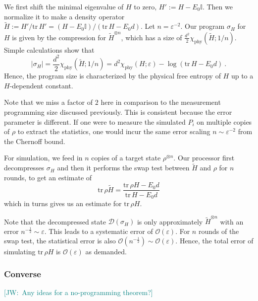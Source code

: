 \documentclass[11pt,letterpaper]{article}
\def\id{\mathbf{1}}
\def\eps{\varepsilon}
\def\O{\mathcal{O}}
\def\id{\mathbb{I}}
\def\tr{\mathrm{tr}}
\newcommand{\JW}[1]{\textcolor{teal}{[JW:\ #1]}}
\begin{document}
We first shift the minimal eigenvalue of $H$ to zero, $H':=H-E_0\id$. Then we normalize it to make a density operator $\tilde H:=H'/\tr\, H'=(H-E_0\id)/(\tr\,H-E_0d)$. Let $n=\eps^{-2}$. Our program $\sigma_H$ for $H$ is given by the compression for $\tilde H^{\otimes n}$, which has a size of $\frac{d^2}{2}\chi_\mathrm{phy}(\tilde H;1/n)$. Simple calculations show that
\begin{equation}
    |\sigma_H|=\frac{d^2}{2}\chi_\mathrm{phy}(\tilde H;1/n) = d^2\chi_\mathrm{phy}(H;\eps) - \log (\tr\, H-E_0d)\ .
\end{equation}
Hence, the program size is characterized by the physical free entropy of $H$ up to a $H$-dependent constant.

Note that we miss a factor of $2$ here in comparison to the measurement programming size discussed previously. This is consistent because the error parameter is different. If one were to measure the simulated $P_i$ on multiple copies of $\rho$ to extract the statistics, one would incur the same error scaling $n\sim \eps^{-2}$ from the Chernoff bound. 

For simulation, we feed in $n$ copies of a target state $\rho^{\otimes n}$. Our processor first decompresses $\sigma_H$ and then it performs the swap test between $\tilde H$ and $\rho$ for $n$ rounds, to get an estimate of
\begin{equation}
    \tr\, \rho\tilde H = \frac{\tr\, \rho H-E_0d}{\tr\, H-E_0d}
\end{equation}
which in turns gives us an estimate for $\tr\,\rho H$. 

Note that the decompressed state $\mathcal{D}(\sigma_H)$ is only approximately $\tilde H^{\otimes n}$ with an error $n^{-\frac12}\sim\eps$. This leads to a systematic error of $\O(\eps)$. For $n$ rounds of the swap test, the statistical error is also $\O(n^{-\frac12})\sim\O(\eps)$. Hence, the total error of simulating $\tr\,\rho H$ is $\O(\eps)$ as demanded.

\subsubsection{Converse}
\JW{Any ideas for a no-programming theorem?}


%



\end{document}
